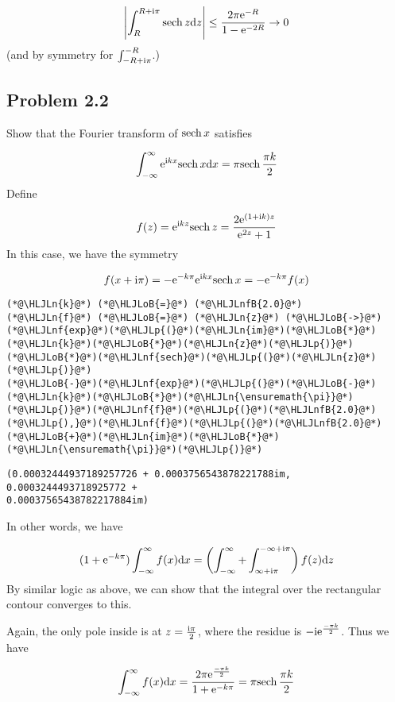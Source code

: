 \documentclass[12pt,a4paper]{article}
\newcommand{\HLJLn}[1]{#1}
\newcommand{\HLJLnf}[1]{\textcolor[RGB]{66,102,213}{#1}}
\newcommand{\HLJLnfB}[1]{\textcolor[RGB]{59,151,46}{#1}}
\newcommand{\HLJLoB}[1]{\textcolor[RGB]{102,102,102}{\textbf{#1}}}
\newcommand{\HLJLp}[1]{#1}
\def\D{ {\rm d} }
\def\I{ {\rm i} }
\def\E{ {\rm e} }
\def\sech{ {\rm sech}\, }
\def\dx{\D x}
\def\dz{\D z}
\begin{document}
\[
 \left|\int_R^{R+\I \pi} \sech z \dz \right| \leq {2 \pi \E^{-R} \over 1 - \E^{-2R}} \rightarrow 0
\]
(and by symmetry for $\int_{-R+\I \pi}^{-R}$.)

\subsection{Problem 2.2}
Show that the Fourier transform of $\sech x$ satisfies

\[
\int_{-\infty}^\infty \E^{\I k x } \sech x \dx = \pi \sech {\pi k \over 2}
\]
Define

\[
f(z) = \E^{\I k z } \sech z = {2 \E^{(1+\I k) z} \over \E^{2 z } + 1}
\]
In this case, we have the symmetry

\[
f(x + \I \pi) = - \E^{- k \pi} \E^{\I k x} \sech x = - \E^{-k \pi} f(x)
\]

\begin{lstlisting}
(*@\HLJLn{k}@*) (*@\HLJLoB{=}@*) (*@\HLJLnfB{2.0}@*)
(*@\HLJLn{f}@*) (*@\HLJLoB{=}@*) (*@\HLJLn{z}@*) (*@\HLJLoB{->}@*) (*@\HLJLnf{exp}@*)(*@\HLJLp{(}@*)(*@\HLJLn{im}@*)(*@\HLJLoB{*}@*)(*@\HLJLn{k}@*)(*@\HLJLoB{*}@*)(*@\HLJLn{z}@*)(*@\HLJLp{)}@*)(*@\HLJLoB{*}@*)(*@\HLJLnf{sech}@*)(*@\HLJLp{(}@*)(*@\HLJLn{z}@*)(*@\HLJLp{)}@*)
(*@\HLJLoB{-}@*)(*@\HLJLnf{exp}@*)(*@\HLJLp{(}@*)(*@\HLJLoB{-}@*)(*@\HLJLn{k}@*)(*@\HLJLoB{*}@*)(*@\HLJLn{\ensuremath{\pi}}@*)(*@\HLJLp{)}@*)(*@\HLJLnf{f}@*)(*@\HLJLp{(}@*)(*@\HLJLnfB{2.0}@*)(*@\HLJLp{),}@*)(*@\HLJLnf{f}@*)(*@\HLJLp{(}@*)(*@\HLJLnfB{2.0}@*)(*@\HLJLoB{+}@*)(*@\HLJLn{im}@*)(*@\HLJLoB{*}@*)(*@\HLJLn{\ensuremath{\pi}}@*)(*@\HLJLp{)}@*)
\end{lstlisting}

\begin{lstlisting}
(0.00032444937189257726 + 0.0003756543878221788im, 0.0003244493718925772 + 
0.00037565438782217884im)
\end{lstlisting}


In other words, we have

\[
(1 + \E^{-k \pi}) \int_{-\infty}^\infty f(x) \dx =\left(\int_{-\infty}^\infty +  \int_{\infty+\I \pi}^{-\infty + \I \pi}\right) f(z) \dz
\]
By similar logic as above, we can show that the integral over the rectangular contour converges to this.

Again, the only pole inside is at $z = {\I \pi \over 2}$, where the residue is $-\I \E^{-\pi k \over 2}$. Thus we have

\[
\int_{-\infty}^\infty f(x) \dx = {2 \pi \E^{-\pi k \over 2} \over 1 + \E^{-k \pi}} = \pi \sech{\pi k \over 2}
\]
\end{document}

